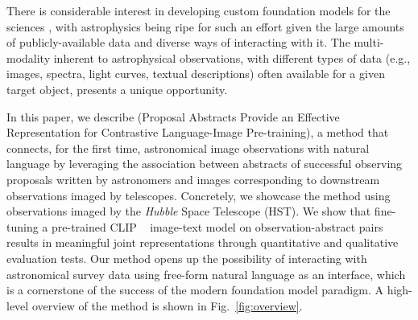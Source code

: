 \documentclass{article} %
\newcommand{\hubble}{\emph{Hubble}\xspace}
\begin{document}
There is considerable interest in developing custom foundation models for the sciences \citep[e.g., ][]{batatia2023foundation,subramanian2023towards,mccabe2023multiple,Birk:2024knn,vig2024finetuning,heinrich2024masked}, with astrophysics being ripe for such an effort given the large amounts of publicly-available data and diverse ways of interacting with it.
%
The multi-modality inherent to astrophysical observations, with different types of data (e.g., images, spectra, light curves, textual descriptions) often available for a given target object, presents a unique opportunity.
%

In this paper, we describe  (Proposal Abstracts Provide an Effective Representation for Contrastive Language-Image Pre-training),
a method that connects, for the first time, astronomical image observations with natural language by leveraging the association between abstracts of successful observing proposals written by astronomers and images corresponding to downstream observations imaged by telescopes. 
%
Concretely, we showcase the method using observations imaged by the \hubble Space Telescope (HST).
%
We show that fine-tuning a pre-trained CLIP ~\citep[Contrastive Language-Image Pre-training; ][]{radford2021learning} image-text model on observation-abstract pairs results in meaningful joint representations through quantitative and qualitative evaluation tests.
%
Our method opens up the possibility of interacting with astronomical survey data using free-form natural language as an interface, which is a cornerstone of the success of the modern foundation model paradigm. A high-level overview of the method is shown in Fig.~\ref{fig:overview}.
%
\end{document}
